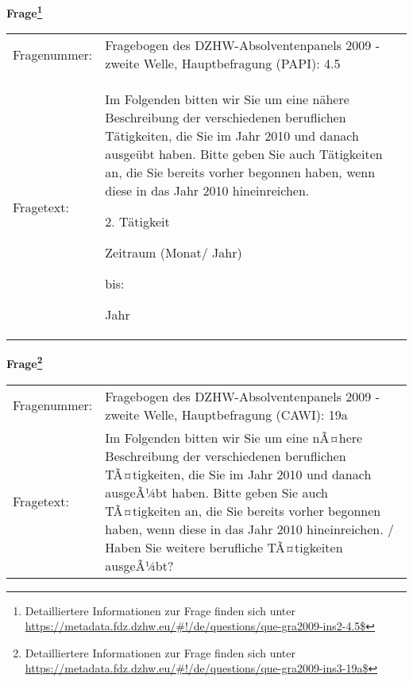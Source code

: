 				\vspace*{0.5cm}
                \noindent\textbf{Frage\footnote{Detailliertere Informationen zur Frage finden sich unter
		              \url{https://metadata.fdz.dzhw.eu/\#!/de/questions/que-gra2009-ins2-4.5$}}}\\
				\begin{tabularx}{\hsize}{@{}lX}
					Fragenummer: &
					  Fragebogen des DZHW-Absolventenpanels 2009 - zweite Welle, Hauptbefragung (PAPI):
					  4.5
 \\
					Fragetext: & Im Folgenden bitten wir Sie um eine nähere Beschreibung der verschiedenen beruflichen Tätigkeiten, die Sie im Jahr 2010 und danach ausgeübt haben. Bitte geben Sie auch Tätigkeiten an, die Sie bereits vorher begonnen haben, wenn diese in das Jahr 2010 hineinreichen.\par  2. Tätigkeit\par  Zeitraum (Monat/ Jahr)\par  bis:\par  Jahr \\
				\end{tabularx}
				\vspace*{0.5cm}
                \noindent\textbf{Frage\footnote{Detailliertere Informationen zur Frage finden sich unter
		              \url{https://metadata.fdz.dzhw.eu/\#!/de/questions/que-gra2009-ins3-19a$}}}\\
				\begin{tabularx}{\hsize}{@{}lX}
					Fragenummer: &
					  Fragebogen des DZHW-Absolventenpanels 2009 - zweite Welle, Hauptbefragung (CAWI):
					  19a
 \\
					Fragetext: & Im Folgenden bitten wir Sie um eine nÃ¤here Beschreibung der verschiedenen beruflichen TÃ¤tigkeiten, die Sie im Jahr 2010 und danach ausgeÃ¼bt haben. Bitte geben Sie auch TÃ¤tigkeiten an, die Sie bereits vorher begonnen haben, wenn diese in das Jahr 2010 hineinreichen. / Haben Sie weitere berufliche TÃ¤tigkeiten ausgeÃ¼bt? \\
				\end{tabularx}






